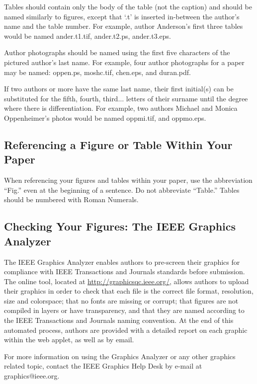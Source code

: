 \documentclass{IEEEtran}
\begin{document}
Tables should contain only the body of the table (not the caption) and 
should be named similarly to figures, except that `.t' is inserted 
in-between the author's name and the table number. For example, author 
Anderson's first three tables would be named ander.t1.tif, ander.t2.ps, 
ander.t3.eps.

Author photographs should be named using the first five characters of the 
pictured author's last name. For example, four author photographs for a 
paper may be named: oppen.ps, moshc.tif, chen.eps, and duran.pdf.

If two authors or more have the same last name, their first initial(s) can 
be substituted for the fifth, fourth, third$\ldots$ letters of their surname 
until the degree where there is differentiation. For example, two authors 
Michael and Monica Oppenheimer's photos would be named oppmi.tif, and 
oppmo.eps.

\subsection{Referencing a Figure or Table Within Your Paper}
When referencing your figures and tables within your paper, use the 
abbreviation ``Fig.'' even at the beginning of a sentence. Do not abbreviate 
``Table.'' Tables should be numbered with Roman Numerals.

\subsection{Checking Your Figures: The IEEE Graphics Analyzer}
The IEEE Graphics Analyzer enables authors to pre-screen their graphics for 
compliance with IEEE Transactions and Journals standards before submission. 
The online tool, located at
\underline{http://graphicsqc.ieee.org/}, allows authors to 
upload their graphics in order to check that each file is the correct file 
format, resolution, size and colorspace; that no fonts are missing or 
corrupt; that figures are not compiled in layers or have transparency, and 
that they are named according to the IEEE Transactions and Journals naming 
convention. At the end of this automated process, authors are provided with 
a detailed report on each graphic within the web applet, as well as by 
email.

For more information on using the Graphics Analyzer or any other graphics 
related topic, contact the IEEE Graphics Help Desk by e-mail at 
graphics@ieee.org.
\end{document}
